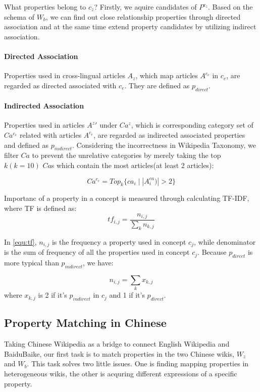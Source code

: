 \documentclass[runningheads,a4paper]{llncs}
\begin{document}
What properties belong to $c_z$? Firstly, we aquire candidates of $P^{c_z}$. Based on the schema of $W_b$, we can find out close relationship properties through directed association and at the same time extend property candidates by utilizing indirect association.

\paragraph{ Directed Association } Properties used in cross-lingual articles $A_z$, which map articles $A^{c_e}$ in $c_e$, are regarded as directed associated with $c_e$. They are defined as $p_{direct}$.

\paragraph {Indirected Association} Properties used in articles ${A^z}'$ under $Ca^{z}$, which is corresponding category set of $Ca^{c_e}$ related with articles $A^{c_e}$, are regarded as indirected associated properties and defined as $p_{indirect}$. Considering the incorrectness in Wikipedia Taxonomy, we filter $Ca$ to prevent the unrelative categories by merely taking the top $k(k=10)$ $Ca$s which contain the most articles(at least 2 articles):

\begin{equation}
Ca^{c_e} = Top_k\{ ca_i\mid |A^{ca}_i)| > 2 \}
\end{equation}

Importanc of a property in a concept is measured through calculating TF-IDF, where TF is defined as:
\begin{equation}
\label{equ:tf}
tf_{i,j}=\frac{n_{i,j}}{\sum_{k}{n_{k,j}}}
\end{equation}

In \ref{equ:tf}, $n_{i,j}$ is the frequency a property used in concept $c_{j}$, while denominator is the sum of frequency of all the properties used in concept $c_{j}$. Because $p_{direct}$ is more typical than $p_{indirect}$, we have:

\begin{equation}
n_{i,j} = {\sum_{k}{x_{k,j}}}
\end{equation}
where $x_{k,j}$ is 2 if it's $p_{indirect}$ in $c_j$ and 1 if it's $p_{direct}$.

\subsection{Property Matching in Chinese}
\label{sec:similar-property}
Taking Chinese Wikipedia as a bridge to connect English Wikipedia and BaiduBaike, our first task is to match properties in the two Chinese wikis, $W_z$ and $W_b$. This task solves two little issues. One is finding mapping properties in heterogeneous wikis, the other is acquring different expressions of a specific property.
\end{document}
